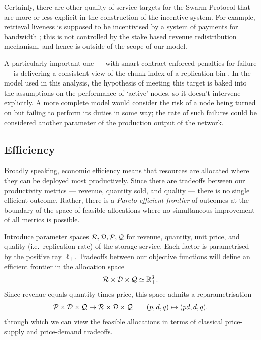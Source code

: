 \begin{remark} 
  \label{quality-metrics}

  Certainly, there are other quality of service targets for the Swarm Protocol that are more or less explicit in the construction of the incentive system.
  For example, retrieval liveness is supposed to be incentivised by a system of payments for bandwidth \cite[\S3.2]{book-of-swarm}; this is not controlled by the stake based revenue redistribution mechanism, and hence is outside of the scope of our model.
  
  A particularly important one --- with smart contract enforced penalties for failure --- is delivering a consistent view of the chunk index of a replication bin \cite[\S3.4.4]{book-of-swarm}.
  In the model used in this analysis, the hypothesis of meeting this target is baked into the assumptions on the performance of `active' nodes, so it doesn't intervene explicitly.
  A more complete model would consider the risk of a node being turned on but failing to perform its duties in some way; the rate of such failures could be considered another parameter of the production output of the network.

\end{remark}

\subsection{Efficiency}
\label{section:efficiency}

Broadly speaking, economic efficiency means that resources are allocated where they can be deployed most productively.
%
Since there are tradeoffs between our productivity metrics --- revenue, quantity sold, and quality --- there is no single efficient outcome.
%
Rather, there is a \emph{Pareto efficient frontier} of outcomes at the boundary of the space of feasible allocations where no simultaneous improvement of all metrics is possible.

Introduce parameter spaces $\mathcal{R},\mathcal{D},\mathcal{P},\mathcal{Q}$ for revenue, quantity, unit price, and quality (i.e.~replication rate) of the storage service.
%
Each factor is parametrised by the positive ray $\mathbb{R}_+$.
%
Tradeoffs between our objective functions will define an efficient frontier in the allocation space
%
\[
  \mathcal{R}\times\mathcal{D}\times\mathcal{Q} \simeq \mathbb{R}_+^3.
\]
%
Since revenue equals quantity times price, this space admits a reparametrisation
%
\[ 
  \mathcal{P} \times\mathcal{D} \times \mathcal{Q} \rightarrow \mathcal{R} \times\mathcal{D}\times \mathcal{Q} \qquad
  (p,d,q) \mapsto (pd, d, q).
\]
%
through which we can view the feasible allocations in terms of classical price-supply and price-demand tradeoffs.

